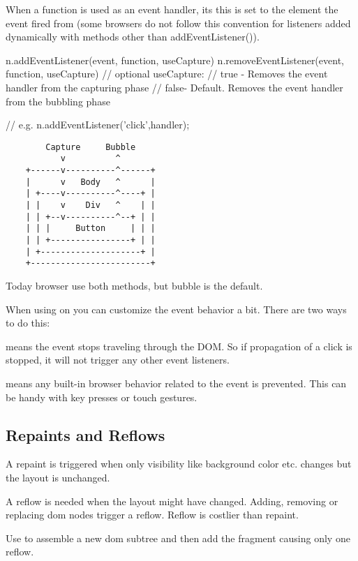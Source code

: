 When a function is used as an event handler, its this is set to the element
the event fired from (some browsers do not follow this convention for
listeners added dynamically with methods other than addEventListener()).

\begin{js}
  n.addEventListener(event, function, useCapture)
  n.removeEventListener(event, function, useCapture)
  // optional useCapture:
  //    true - Removes the event handler from the capturing phase
  //    false- Default. Removes the event handler from the bubbling phase

  // e.g.
  n.addEventListener('click',handler);
\end{js}


\begin{verbatim}
        Capture     Bubble
           v          ^
    +------v----------^------+
    |      v   Body   ^      |
    | +----v----------^----+ |
    | |    v    Div   ^    | |
    | | +--v----------^--+ | |
    | | |     Button     | | |
    | | +----------------+ | |
    | +--------------------+ |
    +------------------------+
\end{verbatim}

Today browser use both methods, but bubble is the default.

When using on you can customize the event behavior a bit. There are two ways
to do this:

 means the event stops traveling through the DOM. So
if propagation of a click is stopped, it will not trigger any other event
listeners.

 means any built-in browser behavior related to the
event is prevented. This can be handy with key presses or touch gestures.



\subsection{Repaints and Reflows}

A repaint is triggered when only visibility like background color etc. changes
but the layout is unchanged.

A reflow is needed when the layout might have changed. Adding, removing or
replacing dom nodes trigger a reflow. Reflow is costlier than repaint.

Use  to assemble a new dom subtree and then add
the fragment causing only one reflow.


